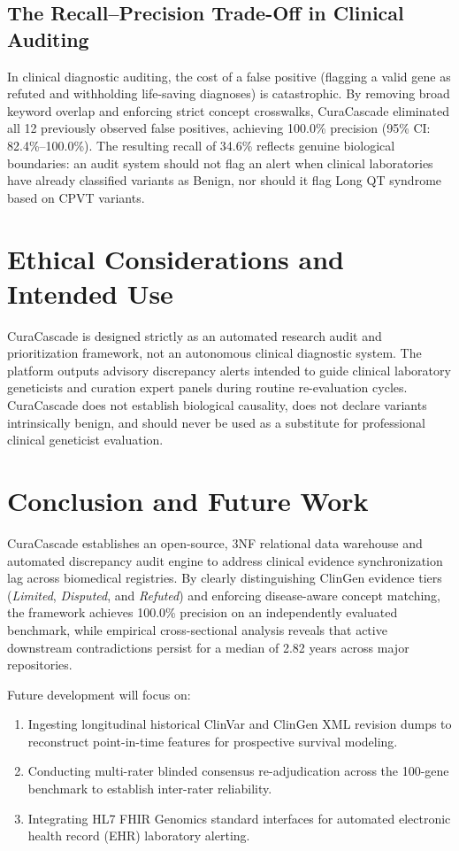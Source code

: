 \documentclass[conference]{IEEEtran}
\begin{document}
\subsection{The Recall--Precision Trade-Off in Clinical Auditing}
In clinical diagnostic auditing, the cost of a false positive (flagging a valid gene as refuted and withholding life-saving diagnoses) is catastrophic. By removing broad keyword overlap and enforcing strict concept crosswalks, CuraCascade eliminated all 12 previously observed false positives, achieving 100.0\% precision (95\% CI: 82.4\%--100.0\%). The resulting recall of 34.6\% reflects genuine biological boundaries: an audit system should not flag an alert when clinical laboratories have already classified variants as Benign, nor should it flag Long QT syndrome based on CPVT variants.

\section{Ethical Considerations and Intended Use}
CuraCascade is designed strictly as an automated research audit and prioritization framework, not an autonomous clinical diagnostic system. The platform outputs advisory discrepancy alerts intended to guide clinical laboratory geneticists and curation expert panels during routine re-evaluation cycles. CuraCascade does not establish biological causality, does not declare variants intrinsically benign, and should never be used as a substitute for professional clinical geneticist evaluation.

\section{Conclusion and Future Work}
CuraCascade establishes an open-source, 3NF relational data warehouse and automated discrepancy audit engine to address clinical evidence synchronization lag across biomedical registries. By clearly distinguishing ClinGen evidence tiers (\textit{Limited}, \textit{Disputed}, and \textit{Refuted}) and enforcing disease-aware concept matching, the framework achieves 100.0\% precision on an independently evaluated benchmark, while empirical cross-sectional analysis reveals that active downstream contradictions persist for a median of 2.82 years across major repositories.

Future development will focus on:
\begin{enumerate}
    \item Ingesting longitudinal historical ClinVar and ClinGen XML revision dumps to reconstruct point-in-time features for prospective survival modeling.
    \item Conducting multi-rater blinded consensus re-adjudication across the 100-gene benchmark to establish inter-rater reliability.
    \item Integrating HL7 FHIR Genomics standard interfaces for automated electronic health record (EHR) laboratory alerting.
\end{enumerate}
\end{document}

